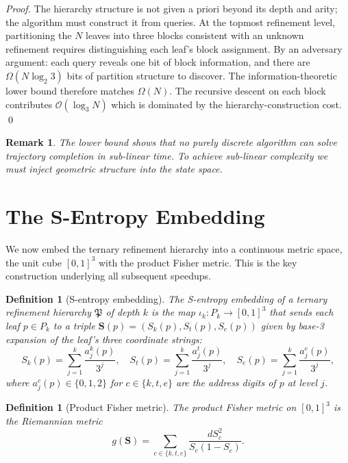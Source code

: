 \documentclass[twocolumn,a4paper]{article}
\newtheorem{definition}[theorem]{Definition}
\newtheorem{remark}[theorem]{Remark}
\newcommand{\Sk}{S_{k}}
\newcommand{\St}{S_{t}}
\newcommand{\Se}{S_{e}}
\newcommand{\Stuple}{\mathbf{S}}
\newcommand{\PPart}{\mathfrak{P}}
\begin{document}
\begin{proof}
The hierarchy structure is not given a priori beyond its depth and arity; the algorithm must construct it from queries. At the topmost refinement level, partitioning the $N$ leaves into three blocks consistent with an unknown refinement requires distinguishing each leaf's block assignment. By an adversary argument: each query reveals one bit of block information, and there are $\Omega(N\log_{2}3)$ bits of partition structure to discover. The information-theoretic lower bound therefore matches $\Omega(N)$. The recursive descent on each block contributes $\mathcal{O}(\log_{3}N)$ which is dominated by the hierarchy-construction cost. \qed
\end{proof}

\begin{remark}
The lower bound shows that no purely discrete algorithm can solve trajectory completion in sub-linear time. To achieve sub-linear complexity we must inject geometric structure into the state space.
\end{remark}

\section{The S-Entropy Embedding}
\label{sec:s-entropy-embedding}

We now embed the ternary refinement hierarchy into a continuous metric space, the unit cube $[0,1]^{3}$ with the product Fisher metric. This is the key construction underlying all subsequent speedups.

\begin{definition}[S-entropy embedding]
\label{def:s-embed}
The \emph{S-entropy embedding} of a ternary refinement hierarchy $\PPart$ of depth $k$ is the map $\iota_{k}\colon P_{k}\to[0,1]^{3}$ that sends each leaf $p\in P_{k}$ to a triple $\Stuple(p)=(\Sk(p),\St(p),\Se(p))$ given by base-3 expansion of the leaf's three coordinate strings:
\[
\Sk(p)=\sum_{j=1}^{k}\frac{a_{j}^{k}(p)}{3^{j}},\quad
\St(p)=\sum_{j=1}^{k}\frac{a_{j}^{t}(p)}{3^{j}},\quad
\Se(p)=\sum_{j=1}^{k}\frac{a_{j}^{e}(p)}{3^{j}},
\]
where $a_{j}^{c}(p)\in\{0,1,2\}$ for $c\in\{k,t,e\}$ are the address digits of $p$ at level $j$.
\end{definition}

\begin{definition}[Product Fisher metric]
\label{def:fisher-metric}
The \emph{product Fisher metric} on $[0,1]^{3}$ is the Riemannian metric
\[
g(\Stuple)=\sum_{c\in\{k,t,e\}}\frac{dS_{c}^{2}}{S_{c}(1-S_{c})}.
\]
\end{definition}
\end{document}
